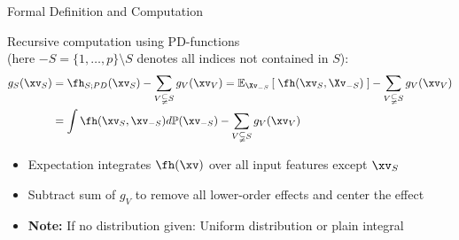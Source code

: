 \documentclass[11pt,compress,t,notes=noshow, aspectratio=169, xcolor=table]{beamer}
\begin{document}
\begin{frame}{Formal Definition and Computation
}

\begin{definition}
    Recursive computation using PD-functions \\
    (here $-S = \{1, \ldots, p \} \setminus S$ denotes all indices not contained in \(S\)):
    \begin{align*}
    g_{S}(\xv_S)
        & = \fh_{S;PD}(\xv_S) - \sum_{V \subsetneqq S} g_V(\xv_V)
        = \mathbb{E}_{\Xv_{-S}} \left[ \; \fh(\xv_S, \Xv_{-S}) \; \right] - \sum_{V \subsetneqq S} g_V(\xv_V) \\
        & = \int \fh(\xv_S, \xv_{-S}) d \mathbb{P}(\xv_{-S}) - \sum_{V \subsetneqq S} g_V(\xv_V)
    \end{align*}
\end{definition}

\begin{itemize}
    \item Expectation integrates $\fh(\xv)$ over all input features except $\xv_S$
    \item Subtract sum of $g_V$ to remove all lower-order effects and center the effect
    \item \textbf{Note:} If no distribution given: Uniform distribution or plain integral
\end{itemize}

\end{frame}
\end{document}
